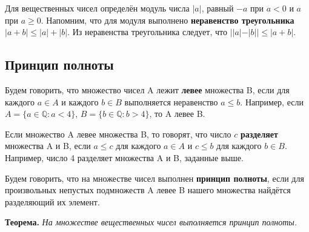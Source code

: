\documentclass[12pt]{article}
\theoremstyle{definition}
\begin{document}
Для вещественных чисел определён модуль числа $|a|$, равный $-a$ при $a < 0$ и $a$ при $a \geq 0$. Напомним, что для модуля выполнено \textbf{неравенство треугольника} $|a+b| \leq |a|+|b|$. Из неравенства треугольника следует, что $||a|-|b|| \leq |a+b|$.

\subsection*{Принцип полноты}
Будем говорить, что множество чисел A лежит \textbf{левее} множества B, если для каждого $a \in A$ и каждого $b \in B$ выполняется неравенство $a \leq b$. Например, если $A=\{a \in \mathbb{Q}:a<4\}$, $B=\{b \in \mathbb{Q}:b>4\}$, то A левее B.

Если множество A левее множества B, то говорят, что число $c$ \textbf{разделяет} множества A и B, если $a \leq c$ для каждого $a \in A$ и $c \leq b$ для каждого $b \in B$. Например, число 4 разделяет множества A и B, заданные выше.

Будем говорить, что на множестве чисел выполнен \textbf{принцип полноты}, если для произвольных непустых подмножеств A левее B нашего множества найдётся разделяющий их элемент.


\textbf{Теорема.} \textit{На множестве вещественных чисел выполняется принцип полноты.}
\end{document}
